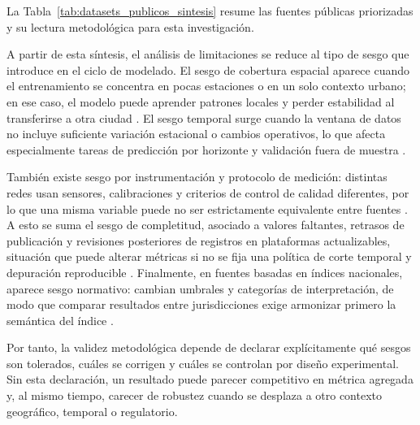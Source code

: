 La Tabla~\ref{tab:datasets_publicos_sintesis} resume las fuentes públicas priorizadas y su lectura metodológica para esta investigación.


A partir de esta síntesis, el análisis de limitaciones se reduce al tipo de sesgo que introduce en el ciclo de modelado. El sesgo de cobertura espacial aparece cuando el entrenamiento se concentra en pocas estaciones o en un solo contexto urbano; en ese caso, el modelo puede aprender patrones locales y perder estabilidad al transferirse a otra ciudad \cite{A084,A144}. El sesgo temporal surge cuando la ventana de datos no incluye suficiente variación estacional o cambios operativos, lo que afecta especialmente tareas de predicción por horizonte y validación fuera de muestra \cite{A135,DATA_UCI_501}. 

También existe sesgo por instrumentación y protocolo de medición: distintas redes usan sensores, calibraciones y criterios de control de calidad diferentes, por lo que una misma variable puede no ser estrictamente equivalente entre fuentes \cite{A178,A084}. A esto se suma el sesgo de completitud, asociado a valores faltantes, retrasos de publicación y revisiones posteriores de registros en plataformas actualizables, situación que puede alterar métricas si no se fija una política de corte temporal y depuración reproducible \cite{DATA_OPENAQ}. Finalmente, en fuentes basadas en índices nacionales, aparece sesgo normativo: cambian umbrales y categorías de interpretación, de modo que comparar resultados entre jurisdicciones exige armonizar primero la semántica del índice \cite{A028}.

Por tanto, la validez metodológica depende de declarar explícitamente qué sesgos son tolerados, cuáles se corrigen y cuáles se controlan por diseño experimental. Sin esta declaración, un resultado puede parecer competitivo en métrica agregada y, al mismo tiempo, carecer de robustez cuando se desplaza a otro contexto geográfico, temporal o regulatorio.


